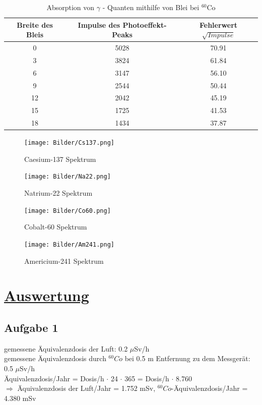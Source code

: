 \documentclass[11pt,a4paper]{article}
\begin{document}
\begin{table}[h]
\caption{Absorption von $\gamma$ - Quanten mithilfe von Blei bei $^{60}$Co}
\centering
\begin{tabular}{c|c|c}
 Breite des Bleis & Impulse des Photoeffekt-Peaks & Fehlerwert $\sqrt{Impulse}$\\\hline
 0 & 5028 & 70.91\\
 3 & 3824 & 61.84\\
 6 & 3147 & 56.10\\
 9 & 2544 & 50.44\\
 12 & 2042 & 45.19\\
 15 & 1725 & 41.53\\
 18 & 1434 & 37.87\\

\end{tabular}
\end{table}
\newpage
\begin{figure}[H]
\texttt{[image: Bilder/Cs137.png]}
\caption{\label{f:myfig} Caesium-137 Spektrum}
\end{figure}
\begin{figure}[H]
\texttt{[image: Bilder/Na22.png]}
\caption{\label{f:myfig} Natrium-22 Spektrum}
\end{figure}
\begin{figure}[H]
\texttt{[image: Bilder/Co60.png]}
\caption{\label{f:myfig} Cobalt-60 Spektrum}
\end{figure}
\begin{figure}[H]
\texttt{[image: Bilder/Am241.png]}
\caption{\label{f:myfig} Americium-241 Spektrum}
\end{figure}
\newpage
\newpage
\section{\underline{Auswertung}}
  \subsection{Aufgabe 1}
   gemessene \"Aquivalenzdosis der Luft: 0.2 $\mu$Sv/h \\
   gemessene \"Aquivalenzdosis durch $^{60}{Co}$ bei 0.5 m Entfernung zu dem Messgerät: 0.5 $\mu$Sv/h \\
   \"Aquivalenzdosis/Jahr = Dosis/h $\cdot$ 24 $\cdot$ 365 = Dosis/h $\cdot$ 8.760 \\
   $\Rightarrow$ \"Aquivalenzdosis der Luft/Jahr = 1.752 mSv, $^{60}{Co}$-\"Aquivalenzdosis/Jahr = 4.380 mSv \\
   
\end{document}
